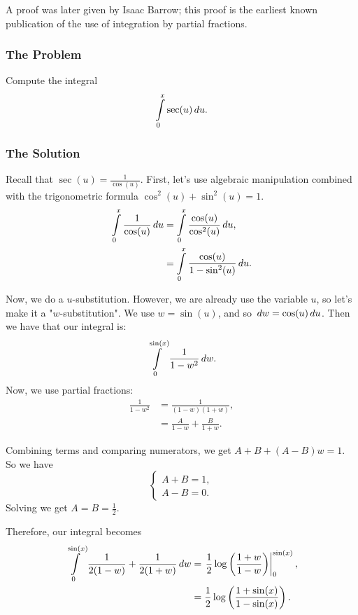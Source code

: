 A proof was later given by Isaac Barrow; this proof is the earliest known publication of the use of integration by partial fractions.

\subsubsection*{The Problem}

Compute the integral
\begin{equation}
\int\limits_0^x \sec(u) \, du.
\end{equation}

\subsubsection*{The Solution}

Recall that \(\sec(u) = \frac{1}{\cos(u)}\). First, let's use algebraic manipulation combined with the trigonometric formula \(\cos^2(u) + \sin^2(u) = 1\).
\begin{align}
\int\limits_0^x \frac{1}{\cos(u)} \, du & = \int\limits_0^x \frac{\cos(u)}{\cos^2(u)} \, du, \\
    & = \int\limits_0^x \frac{\cos(u)}{1 - \sin^2(u)} \, du.
\end{align}

Now, we do a \(u\)-substitution. However, we are already use the variable \(u\), so let's make it a "\(w\)-substitution". 
We use \(w = \sin(u)\), and so \(\, dw = \cos(u) \, du\). Then we have that our integral is:
\begin{equation}
\int\limits_0^{\sin(x)} \frac{1}{1 - w^2} \, dw.
\end{equation}
 Now, we use partial fractions: 
\begin{align}
\frac{1}{1 - w^2} & = \frac{1}{(1 - w)(1 + w)},\\
    & = \frac{A}{1 - w} + \frac{B}{1 + w}.
\end{align}

Combining terms and comparing numerators, we get \(A + B + (A - B)w = 1\). So we have
\begin{equation}
\begin{cases}
A + B = 1, \\
A - B = 0.
\end{cases}
\end{equation}
Solving we get \(A = B = \frac{1}{2}\).

Therefore, our integral becomes
\begin{align}
\int\limits_0^{\sin(x)} \frac{1}{2(1 - w)} + \frac{1}{2(1 + w)} \, dw 
    & = \left. \frac{1}{2} \log\left(\frac{1 + w}{1 - w}\right)\right|_0^{\sin(x)}, \\
    & = \frac{1}{2} \log\left(\frac{1 + \sin(x)}{1 - \sin(x)}\right).
\end{align}

